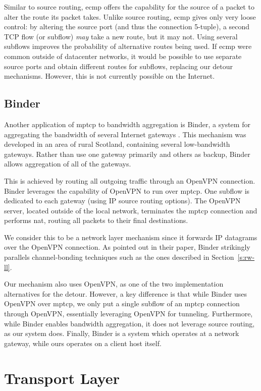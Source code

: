 \documentclass{cwru}
\begin{document}
Similar to source routing, \ac{ecmp} offers the capability for the source of a
packet to alter the route its packet takes. Unlike source routing, \ac{ecmp}
gives only very loose control: by altering the source port (and thus the
connection 5-tuple), a second TCP flow (or subflow) \textit{may} take a new
route, but it may not. Using several subflows improves the probability of
alternative routes being used. If \ac{ecmp} were common outside of datacenter
networks, it would be possible to use separate source ports and obtain different
routes for subflows, replacing our detour mechanisms. However, this is not
currently possible on the Internet.

\subsection{Binder}

Another application of \ac{mptcp} to bandwidth aggregation is Binder, a system
for aggregating the bandwidth of several Internet gateways \cite{binder}. This
mechanism was developed in an area of rural Scotland, containing several
low-bandwidth gateways. Rather than use one gateway primarily and others as
backup, Binder allows aggregation of all of the gateways.

This is achieved by routing all outgoing traffic through an OpenVPN connection.
Binder leverages the capability of OpenVPN to run over \ac{mptcp}. One subflow
is dedicated to each gateway (using IP source routing options). The OpenVPN
server, located outside of the local network, terminates the \ac{mptcp}
connection and performs \ac{nat}, routing all packets to their final
destinations.

We consider this to be a network layer mechanism since it forwards IP datagrams
over the OpenVPN connection. As pointed out in their paper, Binder strikingly
parallels channel-bonding techniques such as the ones described in
Section~\ref{s:rw-ll}.

Our mechanism also uses OpenVPN, as one of the two implementation alternatives
for the detour. However, a key difference is that while Binder uses OpenVPN over
\ac{mptcp}, we only put a single subflow of an \ac{mptcp} connection through
OpenVPN, essentially leveraging OpenVPN for tunneling. Furthermore, while Binder
enables bandwidth aggregation, it does not leverage source routing, as our
system does. Finally, Binder is a system which operates at a network gateway,
while ours operates on a client host itself.

\section{Transport Layer}
\end{document}
